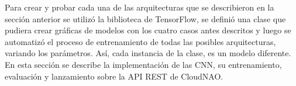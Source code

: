 %
%
%
%
%
%
%

%


Para crear y probar cada una de las arquitecturas que se
describieron en la sección anterior se utilizó la biblioteca
de TensorFlow, se definió una clase que pudiera crear gráficas de modelos
con los cuatro casos antes descritos y luego se automatizó el proceso de
entrenamiento de todas las posibles arquitecturas, variando los parámetros.
Así, cada instancia de la clase, es un modelo diferente. En esta sección se 
describe la implementación de las CNN, su entrenamiento, evaluación
y lanzamiento sobre la API REST de CloudNAO.


